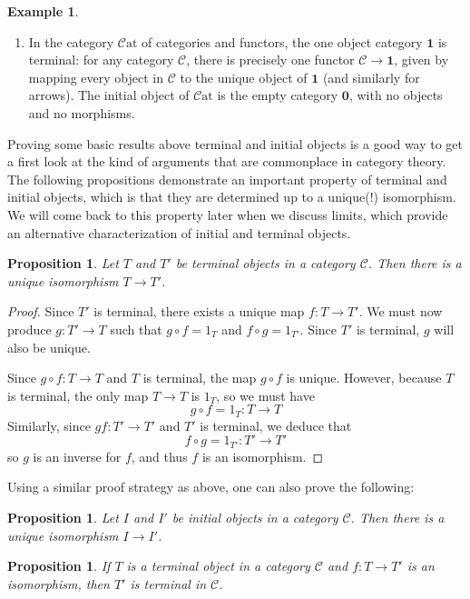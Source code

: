 \documentclass[10pt,oneside]{book}
\def\~#1{\mathscr{#1}}
\newcommand{\Cat}{\~C\mathrm{at}}
\theoremstyle{plain}
\newtheorem{prop}[thm]{Proposition}
\theoremstyle{definition}
\newtheorem{ex}[thm]{Example}
\theoremstyle{remark}
\numberwithin{equation}{section}
\numberwithin{figure}{section}
\begin{document}
\begin{ex}
\begin{enumerate}[label=(\roman*)]
    \item In the category $\Cat$ of categories and functors, the one object category $\mathbf{1}$ is terminal: for any category $\~C$, there is precisely one functor $\~C \to \mathbf{1}$, given by mapping every object in $\~C$ to the unique object of $\mathbf{1}$ (and similarly for arrows). The initial object of $\Cat$ is the empty category $\mathbf{0}$, with no objects and no morphisms. 
\end{enumerate}
\end{ex}

Proving some basic results above terminal and initial objects is a good way to get a first look at the kind of arguments that are commonplace in category theory. The following propositions demonstrate an important property of terminal and initial objects, which is that they are determined up to a unique(!) isomorphism. We will come back to this property later when we discuss limits, which provide an alternative characterization of initial and terminal objects.

\begin{prop}
\label{prop:terminal_objects_are_isomorphic}
    Let $T$ and $T'$ be terminal objects in a category $\~C$. Then there is a unique isomorphism $T \to T'$.
\end{prop}

\begin{proof}
    Since $T'$ is terminal, there exists a unique map $f: T \to T'$. We must now produce $g: T' \to T$ such that $g \circ f = 1_T$ and $f \circ g = 1_{T'}$. Since $T'$ is terminal, $g$ will also be unique.
    
    Since $g \circ f: T \to T$ and $T$ is terminal, the map $g \circ f$ is unique. However, because $T$ is terminal, the only map $T \to T$ is $1_T$, so we must have 
    \[g \circ f = 1_T : T \to T\]
    Similarly, since $gf: T' \to T'$ and $T'$ is terminal, we deduce that 
    \[f \circ g = 1_{T'}: T' \to T'\]
    so $g$ is an inverse for $f$, and thus $f$ is an isomorphism.
\end{proof}

Using a similar proof strategy as above, one can also prove the following:
\begin{prop}
    Let $I$ and $I'$ be initial objects in a category $\~C$. Then there is a unique isomorphism $I \to I'$.
\end{prop}

\begin{prop}
    If $T$ is a terminal object in a category $\~C$ and $f: T \to T'$ is an isomorphism, then $T'$ is terminal in $\~C$.
\end{prop}
\end{document}
